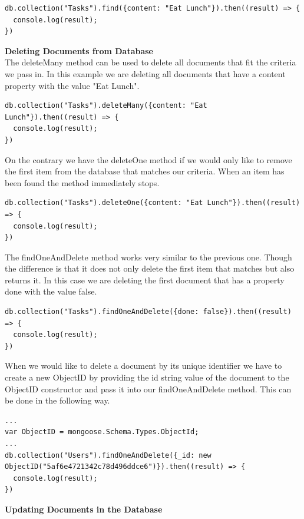 \documentclass[11pt]{article}
\begin{document}
\begin{lstlisting}
db.collection("Tasks").find({content: "Eat Lunch"}).then((result) => {
  console.log(result);
})
\end{lstlisting}

\noindent
\textbf{Deleting Documents from Database} \\  
The deleteMany method can be used to delete all documents that fit the criteria we pass in. In this example we are deleting all documents that have a content property with the value "Eat Lunch". 

\begin{lstlisting}
db.collection("Tasks").deleteMany({content: "Eat Lunch"}).then((result) => {
  console.log(result);
})
\end{lstlisting}

On the contrary we have the deleteOne method if we would only like to remove the first item from the database that matches our criteria. When an item has been found the method immediately stops. 
\begin{lstlisting}
db.collection("Tasks").deleteOne({content: "Eat Lunch"}).then((result) => {
  console.log(result);
})
\end{lstlisting}


The findOneAndDelete method works very similar to the previous one. Though the difference is that it does not only delete the first item that matches but also returns it. In this case we are deleting the first document that has a property done with the value false. 

\begin{lstlisting}
db.collection("Tasks").findOneAndDelete({done: false}).then((result) => {
  console.log(result);
})
\end{lstlisting}

When we would like to delete a document by its unique identifier we have to create a new ObjectID by providing the id string value of the document to the ObjectID constructor and pass it into our findOneAndDelete method. This can be done in the following way. 

\begin{lstlisting}
...
var ObjectID = mongoose.Schema.Types.ObjectId;
...
db.collection("Users").findOneAndDelete({_id: new ObjectID("5af6e4721342c78d496ddce6")}).then((result) => {
  console.log(result);
})
\end{lstlisting}  

\noindent
\textbf{Updating Documents in the Database} \\  
\end{document}
